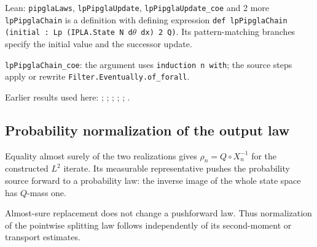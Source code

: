 \documentclass[11pt,a4paper]{report}
\begin{document}
\begin{leanbox}{Lean: \texttt{pipglaLaws}, \texttt{lpPipglaUpdate}, \texttt{lpPipglaUpdate\_\allowbreak{}coe} and 2 more}
\texttt{lp\allowbreak{}Pipgla\allowbreak{}Chain} is a definition with defining expression \texttt{def lp\allowbreak{}Pipgla\allowbreak{}Chain (initial : Lp (IPLA.\allowbreak{}State N d\ensuremath{\theta} dx) 2 Q)}. Its pattern-matching branches specify the initial value and the successor update.



\texttt{lp\allowbreak{}Pipgla\allowbreak{}Chain\_\allowbreak{}coe}: the argument uses \texttt{induction n with}; the source steps apply or rewrite \texttt{Filter.\allowbreak{}Eventually.\allowbreak{}of\_\allowbreak{}forall}.
\end{leanbox}


Earlier results used here: \cite[Section~3.13.11]{LangevinLean2026ULASC}; \cite[Section~3.13.12]{LangevinLean2026ULASC}; \cite[Section~3.13.2]{LangevinLean2026ULASC}; \cite[Section~3.13.3]{LangevinLean2026ULASC}; \cite[Section~3.1.1]{LangevinLean2026IPLA}; \cite[Section~3.1.4]{LangevinLean2026IPLA}.
\subsection{\texorpdfstring{Probability normalization of the output law}{Probability normalization of the output law}}
\label{report-step-ProximalLangevin-SplittingLaw-lean-3}


Equality almost surely of the two realizations gives \(\rho_n=Q\circ X_n^{-1}\) for the constructed \(L^2\) iterate. Its measurable representative pushes the probability source forward to a probability law: the inverse image of the whole state space has \(Q\)-mass one.



Almost-sure replacement does not change a pushforward law. Thus normalization of the pointwise splitting law follows independently of its second-moment or transport estimates.
\end{document}
